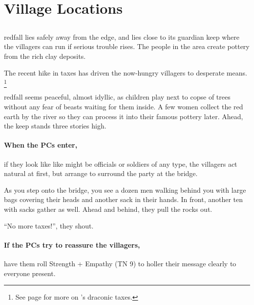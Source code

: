 \section{Village Locations}


\begin{multicols}{2}

\subsection{}
\label{redfallVillage}

\Gls{redfall} lies safely away from the \gls{edge}, and lies close to its guardian keep where the villagers can run if serious trouble rises.
The people in the area create pottery from the rich clay deposits.

The recent hike in taxes has driven the now-hungry villagers to desperate means.%
\footnote{See page \pageref{desperatemeasures} for more on 's draconic taxes.}

\begin{boxtext}
  \Gls{redfall} seems peaceful, almost idyllic, as children play next to copse of trees without any fear of beasts waiting for them inside.
  A few women collect the red earth by the river so they can process it into their famous pottery later.
  Ahead, the keep stands three stories high.
\end{boxtext}

\paragraph{When the PCs enter,}
if they look like like might be officials or soldiers of any type, the villagers act natural at first, but arrange to surround the party at the bridge.

\begin{boxtext}

  As you step onto the bridge, you see a dozen men walking behind you with large bags covering their heads and another sack in their hands.
  In front, another ten with sacks gather as well.
  Ahead and behind, they pull the rocks out.

  ``No more taxes!'', they shout.

\end{boxtext}

\paragraph{If the PCs try to reassure the villagers,}
have them roll Strength + Empathy (TN 9) to holler their message clearly to everyone present.


\end{multicols}
